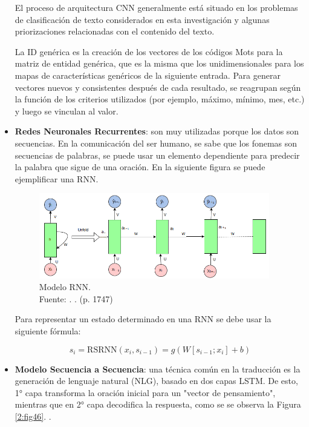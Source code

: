 \begin{itemize}
 	El proceso de arquitectura CNN generalmente está situado en los problemas de clasificación de texto considerados en esta investigación y algunas priorizaciones relacionadas con el contenido del texto.

 	La ID genérica es la creación de los vectores de los códigos Mots para la matriz de entidad genérica, que es la misma que los unidimensionales para los mapas de características genéricos de la siguiente entrada. Para generar vectores nuevos y consistentes después de cada resultado, se reagrupan según la función de los criterios utilizados (por ejemplo, máximo, mínimo, mes, etc.) y luego se vinculan al valor.

	\item \textbf{Redes Neuronales Recurrentes}: son muy utilizadas porque los datos son secuencias. En la comunicación del ser humano, se sabe que los fonemas son secuencias de palabras, se puede usar un elemento dependiente para predecir la palabra que sigue de una oración. En la siguiente figura se puede ejemplificar una RNN. \parencite{bk_rao2019nlp_pytorch}
	\begin{figure}[!ht]
		\begin{center}
			\includegraphics[width=0.95\textwidth]{2/figures/rnn.png}
			\caption[Modelo RNN]{Modelo RNN.\\
			Fuente: \cite{bk_rao2019nlp_pytorch}. . (p. 1747)}
			\label{2:fig41}
		\end{center}
	\end{figure}

	Para representar un estado determinado en una RNN se debe usar la siguiente fórmula:

	\begin{equation}\label{eq:RNN}
		s_i = \text{RSRNN}(x_i, s_{i-1}) = g(W[s_{i-1}; x_i] + b)
	\end{equation}

	\item \textbf{Modelo Secuencia a Secuencia}: una técnica común en la traducción es la generación de lenguaje natural (NLG), basado en dos capas LSTM. De esto, 1° capa transforma la oración inicial para un "vector de pensamiento", mientras que en 2° capa decodifica la respuesta, como se se observa la Figura \ref{2:fig46}. \parencite{bk_deng2018deeplearningnlp}.
	

\end{itemize}
